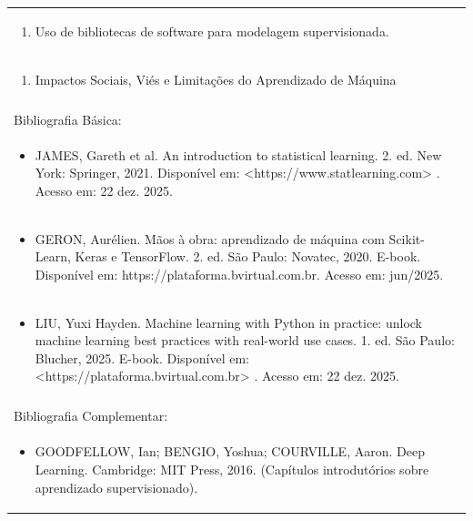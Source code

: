 \documentclass[11pt]{article}
\begin{document}
\begin{center}
\begin{longtable}{|p{4cm}|p{4cm}|p{4cm}|p{4cm}|}
\multicolumn{4}{|p{\dimexpr 16cm + 6\tabcolsep\relax}|}{\begin{enumerate}[start=10]\item Uso de bibliotecas de software para modelagem supervisionada.\end{enumerate}}\\
\multicolumn{4}{|p{\dimexpr 16cm + 6\tabcolsep\relax}|}{\begin{enumerate}[start=11]\item Impactos Sociais, Viés e Limitações do Aprendizado de Máquina\end{enumerate}}\\
\multicolumn{4}{|p{\dimexpr 16cm + 6\tabcolsep\relax}|}{}\\
\hline
\multicolumn{4}{|p{16cm}|}{Bibliografia Básica:}\\*
\multicolumn{4}{|p{\dimexpr 16cm + 6\tabcolsep\relax}|}{\begin{itemize}\item JAMES, Gareth et al. An introduction to statistical learning. 2. ed. New York: Springer, 2021. Disponível em: <https://www.statlearning.com> . Acesso em: 22 dez. 2025.\end{itemize}}\\
\multicolumn{4}{|p{\dimexpr 16cm + 6\tabcolsep\relax}|}{\begin{itemize}\item GERON, Aurélien. Mãos à obra: aprendizado de máquina com Scikit-Learn, Keras e TensorFlow. 2. ed. São Paulo: Novatec, 2020. E-book. Disponível em: https://plataforma.bvirtual.com.br. Acesso em: jun/2025.\end{itemize}}\\
\multicolumn{4}{|p{\dimexpr 16cm + 6\tabcolsep\relax}|}{\begin{itemize}\item LIU, Yuxi Hayden. Machine learning with Python in practice: unlock machine learning best practices with real-world use cases. 1. ed. São Paulo: Blucher, 2025. E-book. Disponível em: <https://plataforma.bvirtual.com.br> . Acesso em: 22 dez. 2025.\end{itemize}}\\
\multicolumn{4}{|p{16cm}|}{}\\
\hline
\multicolumn{4}{|p{16cm}|}{Bibliografia Complementar:}\\*
\multicolumn{4}{|p{\dimexpr 16cm + 6\tabcolsep\relax}|}{\begin{itemize}\item GOODFELLOW, Ian; BENGIO, Yoshua; COURVILLE, Aaron. Deep Learning. Cambridge: MIT Press, 2016. (Capítulos introdutórios sobre aprendizado supervisionado).\end{itemize}}\\

\end{longtable}
\end{center}
\end{document}
